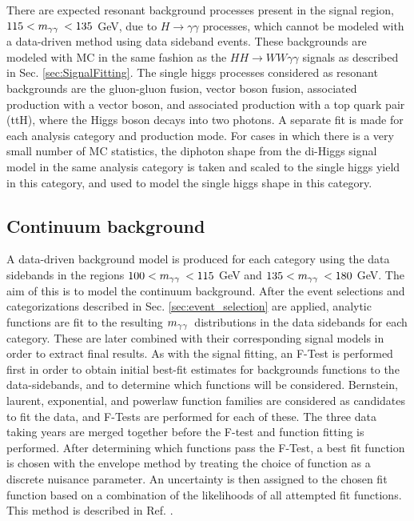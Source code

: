 There are expected resonant background processes present in the signal region, $115 < m_{\gamma\gamma}\hspace{0.2em} < 135$ GeV, due to $H\rightarrow\gamma\gamma$ processes, which cannot be modeled with a data-driven
method using data sideband events. These backgrounds are modeled with MC in the same fashion as the $HH\rightarrow WW\gamma\gamma$ signals as described in Sec. \ref{sec:SignalFitting}. The single higgs
processes considered as resonant backgrounds are the gluon-gluon fusion, vector boson fusion, associated production with a vector boson, and associated production with a top quark pair (ttH), where the Higgs boson decays
into two photons. A separate fit is made for each analysis category and production mode. For cases in which there is a very small number of MC statistics, the diphoton shape from
the di-Higgs signal model in the same analysis category is taken and scaled to the single higgs yield in this category, and used to model the single higgs shape in this category.

\subsection{Continuum background}
\label{sec:AnalyticFitting_Background}

A data-driven background model is produced for each category using the data sidebands in the regions $100 < m_{\gamma\gamma}\hspace{0.2em} < 115$ GeV and $135 < m_{\gamma\gamma}\hspace{0.2em} < 180$ GeV.
The aim of this is to model the continuum background.
After the event selections and categorizations described in Sec. \ref{sec:event_selection} are applied, analytic functions are fit to the resulting $m_{\gamma\gamma}\hspace{0.2em}$ distributions in the data sidebands for each category.
These are later combined with their corresponding signal models in order to extract final results.
As with the signal fitting, an F-Test is performed first in order to obtain initial best-fit estimates for backgrounds functions to the data-sidebands, and to determine which functions will be considered.
Bernstein, laurent, exponential, and powerlaw function families are considered as
candidates to fit the data, and F-Tests are performed for each of these. The three data taking years are merged together before the F-test and function fitting is performed.
After determining which functions pass the F-Test, a best fit function is chosen with the envelope method by treating the choice of function as a discrete nuisance parameter.
An uncertainty is then assigned to the chosen fit function based on a combination of the likelihoods of all attempted fit functions. This method is described in
Ref. \cite{Dauncey_2015}.

